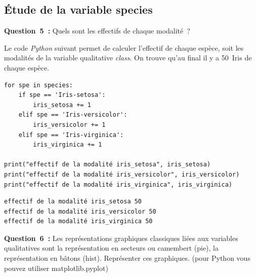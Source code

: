 \subsection{Étude de la variable species}

\vspace{.2cm}

\noindent
\textbf{Question~5~:} Quels sont les effectifs de chaque modalité~? 
\vspace{.2cm}

Le code \textit{Python} suivant permet de calculer l'effectif de chaque espèce, soit les modalités de la variable qualitative \textit{class}. 
On trouve qu'au final il y a 50~Iris de chaque espèce.
\begin{lstlisting}[style=myPython, caption=Code Pyton pour déterminer les effectifs de chaque modalités, frame=lines]
for spe in species:
    if spe == 'Iris-setosa':
        iris_setosa += 1
    elif spe == 'Iris-versicolor':
        iris_versicolor += 1
    elif spe == 'Iris-virginica':
        iris_virginica += 1

print("effectif de la modalité iris_setosa", iris_setosa)
print("effectif de la modalité iris_versicolor", iris_versicolor)
print("effectif de la modalité iris_virginica", iris_virginica)
\end{lstlisting}

\begin{lstlisting}[style=myLog, caption=Résultat du code, frame=lines]
effectif de la modalité iris_setosa 50
effectif de la modalité iris_versicolor 50
effectif de la modalité iris_virginica 50
\end{lstlisting}

\vspace{.5cm}


\noindent
\textbf{Question~6~:} Les représentations graphiques classiques liées aux variables qualitatives sont la 
représentation en secteurs ou camembert (pie), la représentation en bâtons (hist). Représenter ces graphiques. (pour Python vous pouvez utiliser matplotlib.pyplot)
\vspace{.2cm}

